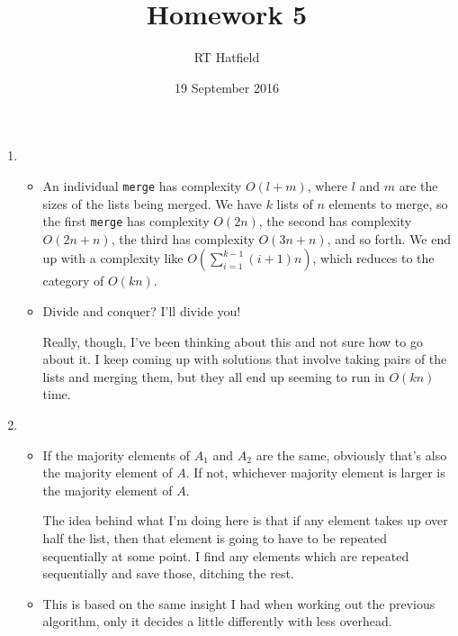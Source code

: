 \documentclass{article}
\title{Homework 5}
\author{RT Hatfield}
\date{19 September 2016}
\begin{document}
    \maketitle
    \begin{enumerate}
        \item \begin{itemize}
            \item An individual \lstinline`merge` has complexity $O(l + m)$, where $l$ and $m$ are the sizes of the lists being
            merged.  We have $k$ lists of $n$ elements to merge, so the first \lstinline`merge` has complexity $O(2n)$, 
            the second has complexity $O(2n + n)$, the third has complexity $O(3n + n)$, and so forth.  We end up with 
            a complexity like $O(\sum_{i=1}^{k - 1} (i+1)n)$, which reduces to the category of $O(kn)$.
            \item Divide and conquer?  I'll divide you!  

            Really, though, I've been thinking about this and not sure how to go about it.  I keep coming up with solutions
            that involve taking pairs of the lists and merging them, but they all end up seeming to run in $O(kn)$ time.
        \end{itemize}
        \item \begin{itemize}
            \item If the majority elements of $A_1$ and $A_2$ are the same, obviously that's also the majority
            element of $A$.  If not, whichever majority element is larger is the majority element of $A$.

            The idea behind what I'm doing here is that if any element takes up over half the list, then that element
            is going to have to be repeated sequentially at some point.  I find any elements which are repeated sequentially
            and save those, ditching the rest.

            \begin{procedure}[H]
            \end{procedure} 
            \item This is based on the same insight I had when working out the previous algorithm, only it decides
            a little differently with less overhead.


\end{itemize}
\end{enumerate}
\end{document}
